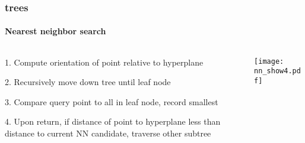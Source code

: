 \begin{frame}[noframenumbering]
  \frametitle{\kd trees}
  \framesubtitle{Nearest neighbor search}
  \begin{columns}[T]
    \begin{column}{.5\textwidth}
      \begin{block}{}%
        {\color{white} 
          
        {\color{graph-red}
        1.\hspace{1mm} Compute orientation of point relative to hyperplane}
          \\\vspace{0.4cm}
        
        2.\hspace{1mm} Recursively move down tree until leaf node\\\vspace{0.4cm}

        3.\hspace{1mm} Compare query point to all in leaf node, record smallest\\\vspace{0.4cm}
    
        4.\hspace{1mm} Upon return, if distance of point to hyperplane less than distance to current
          NN candidate, traverse other subtree}
      \end{block}
    \end{column}
    \begin{column}{.5\textwidth}
      \begin{block}{}
        \texttt{[image: nn\_show4.pdf]}
      \end{block}
    \end{column}
  \end{columns}
\end{frame}
